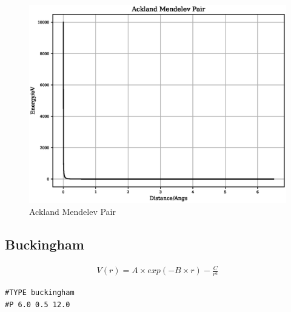 \FloatBarrier
\begin{figure}[h]
  \begin{center}
    \includegraphics[scale=0.5]{appendix/functions/plots/ackland_mendelev_pair.eps}
    \caption{Ackland Mendelev Pair}
    \label{graph:graph1}
  \end{center}
\end{figure}
\FloatBarrier










\subsection{Buckingham}

\begin{equation}
\begin{split}
V(r) = A \times exp(-B \times r) - \frac{C}{r^6}
\end{split}
\label{eq:eqBuckingham}
\end{equation}

\begin{lstlisting}[style=pseudocode,caption={Buckingham}]
#TYPE buckingham
#P 6.0 0.5 12.0
\end{lstlisting}


